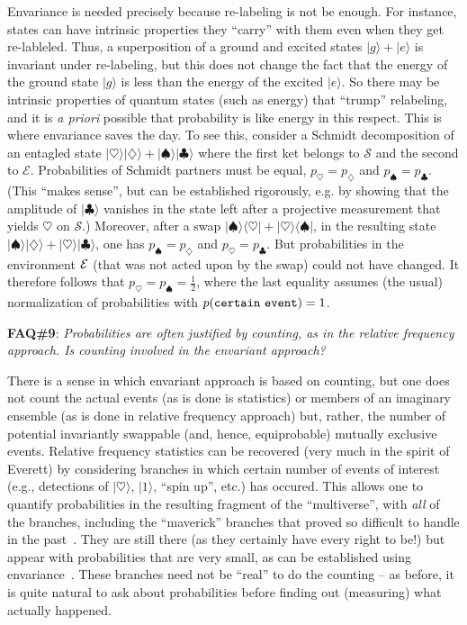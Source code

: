 \documentclass[aps,amsmath,amssymb,amsfonts,12pt]{revtex4-1}
\newcommand{\bra}[1]    {\langle #1|}
\newcommand{\ket}[1]    {| #1 \rangle}
\newcommand{\cS}        {{\mathcal S}}
\newcommand{\cE}        {{\mathcal E}}
\newcommand{\+}         {\dagger}
\begin{document}
{{{Envariance is needed precisely because re-labeling is not be enough. For instance, states can have intrinsic properties they ``carry'' with them even when they get re-lableled. Thus, a superposition of a ground and excited states $\ket g + \ket e$ is invariant under re-labeling, but this does not change the fact that the energy of the ground state $\ket g$ is less than the energy of the excited $\ket e$. So there may be intrinsic properties of quantum states (such as energy) that ``trump'' relabeling, and it is {\it a priori} possible that probability is like energy in this respect. This is where envariance saves the day. To see this, consider a Schmidt decomposition of an entagled state 
$\ket \heartsuit \ket \diamondsuit + \ket \spadesuit \ket \clubsuit $ where the first ket belongs to $\cS$ and the second to $\cE$. Probabilities of Schmidt partners must be equal, $p_{\heartsuit} = p_{\diamondsuit}$ and $p_{\spadesuit}=p_{\clubsuit}$. (This ``makes sense'', but can be established rigorously, e.g. by showing that the amplitude of $\ket \clubsuit$ vanishes in the state left after a projective measurement that yields $\heartsuit$ on $\cS$.) Moreover, after a swap $\ket \spadesuit \bra \heartsuit + \ket \heartsuit \bra \spadesuit$, in the resulting state $\ket \spadesuit \ket \diamondsuit + \ket \heartsuit \ket \clubsuit $, one has $p_{\spadesuit} = p_{\diamondsuit}$ and $p_{\heartsuit }=p_{\clubsuit}$. But probabilities in the environment ${\cal E}$ (that was not acted upon by the swap) could not have changed. It therefore follows that $p_{\heartsuit} = p_{\spadesuit}=\frac 1 2$, where the last equality assumes (the usual) normalization of probabilities with $p({\tt certain \ event}) = 1$. 

{\bf FAQ\#9}: {\it Probabilities are often justified by counting, as in the relative frequency approach. Is  counting involved in the envariant approach?}

There is a sense in which envariant approach is based on counting, but one does not count the actual events (as is done is statistics) or members of an imaginary ensemble (as is done in relative frequency approach) but, rather, the number of potential invariantly swappable (and, hence, equiprobable) mutually exclusive events. Relative frequency statistics can be recovered (very much in the spirit of Everett) by considering branches in which certain number of events of interest (e.g., detections of $\ket \heartsuit$, $\ket 1$, ``spin up'', etc.) has occured. This allows one to quantify probabilities in the resulting fragment of the ``multiverse'', with {\it all} of the branches, including the ``maverick'' branches that proved so difficult to handle in the past~\cite{20,21,22,31,48,49,37}. They are still there (as they certainly have every right to be!) but appear with probabilities that are very small, as can be established using envariance~\cite{78}. These branches need not be ``real'' to do the counting -- as before, it is quite natural to ask about probabilities before finding out (measuring) what actually happened.

}}}
\end{document}

